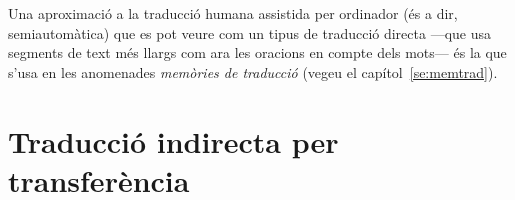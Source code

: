 Una aproximació a la traducció humana assistida per ordinador (és a
dir, semiautomàtica) que es pot veure com un tipus de traducció
directa ---que usa segments de text més llargs com ara les oracions en
compte dels mots--- és la que s'usa en les anomenades \emph{memòries
  de traducció} (vegeu el capítol~\ref{se:memtrad}).


  

\section{Traducció  indirecta per transferència}

